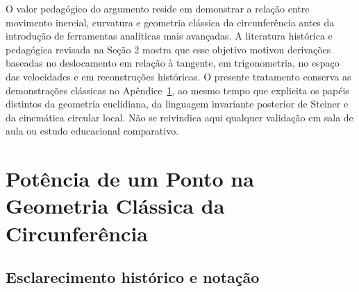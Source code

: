 \documentclass[12pt,a4paper]{article}
\numberwithin{equation}{section}
\theoremstyle{remark}
\begin{document}
O valor pedagógico do argumento reside em demonstrar a relação entre movimento inercial, curvatura e geometria clássica da circunferência antes da introdução de ferramentas analíticas mais avançadas. A literatura histórica e pedagógica revisada na Seção 2 mostra que esse objetivo motivou derivações baseadas no deslocamento em relação à tangente, em trigonometria, no espaço das velocidades e em reconstruções históricas. O presente tratamento conserva as demonstrações clássicas no Apêndice~\ref{app:power-point}, ao mesmo tempo que explicita os papéis distintos da geometria euclidiana, da linguagem invariante posterior de Steiner e da cinemática circular local. Não se reivindica aqui qualquer validação em sala de aula ou estudo educacional comparativo.






\appendix
\setcounter{subsection}{0}
\renewcommand{\thesubsection}{A.\arabic{subsection}}
\setcounter{figure}{0}
\renewcommand{\thefigure}{A.\arabic{figure}}
\renewcommand{\theproposition}{A.\arabic{proposition}}
\section{Potência de um Ponto na Geometria Clássica da Circunferência}\label{app:power-point}

\subsection{Esclarecimento histórico e notação}
\end{document}
